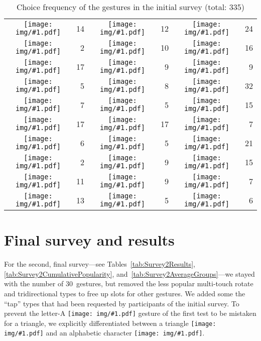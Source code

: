 \documentclass{aes130}
\newcommand{\sixthpic}[1][]{\texttt{[image: img/\#1.pdf]}}
\begin{document}
\begin{table}
\begin{center}
\begin{tabular}{cr|cr|cr} 
\sixthpic[right]            &  14 & \sixthpic[up]           &  12 & \sixthpic[rotate-clockwise]              & 24 \\
\sixthpic[right-up]         & 2 & \sixthpic[up-left]      &  10 & \sixthpic[rotate-counterclockwise]       & 16 \\ 
\sixthpic[right-down]       & 17 & \sixthpic[up-right]     &  9 & \sixthpic[digit-1]                       &  9 \\ 
\sixthpic[right-left]       & 5 & \sixthpic[up-down]      &  8 & \sixthpic[letter-a]                      & 32\\ 
\sixthpic[right-left-right] &  7 & \sixthpic[up-down-up]   &  5 & \sixthpic[multi-pinch-horizontal]        & 15 \\ 
\sixthpic[left]             &  17 & \sixthpic[down]         & 17 & \sixthpic[multi-pinch-vertical]          &  7 \\
\sixthpic[left-up]          &  6 & \sixthpic[down-left]    &  5 & \sixthpic[multi-spread-horizontal]       & 21 \\ 
\sixthpic[left-down]        &  2 & \sixthpic[down-right]   &  9 & \sixthpic[multi-spread-vertical]         & 15 \\ 
\sixthpic[left-right]       &  11 & \sixthpic[down-up]      &  9 & \sixthpic[multi-rotate-clockwise]        &  7 \\ 
\sixthpic[left-right-left]  &  13 & \sixthpic[down-up-down] &  5 & \sixthpic[multi-rotate-counterclockwise] &  6 \\ 
\end{tabular}
\end{center}
\caption{Choice frequency of the gestures in the initial survey (total: 335)}
\label{tab:Survey1RateOfChoices}
\end{table}

\section{Final survey and results}\label{final}

For the second, final survey---see Tables~\ref{tab:Survey2Results}, \ref{tab:Survey2CumulativePopularity}, and~\ref{tab:Survey2AverageGroups}---we stayed with the number of 30~gestures, but removed the less popular multi-touch rotate and tridirectional types to free up slots for other gestures. We added some the ``tap'' types that had been requested by participants of the initial survey. To prevent the letter-A \sixthpic[letter-a] gesture of the first test to be mistaken for a triangle, we explicitly differentiated between a triangle \sixthpic[triangle] and an alphabetic character \sixthpic[letters].
\end{document}
